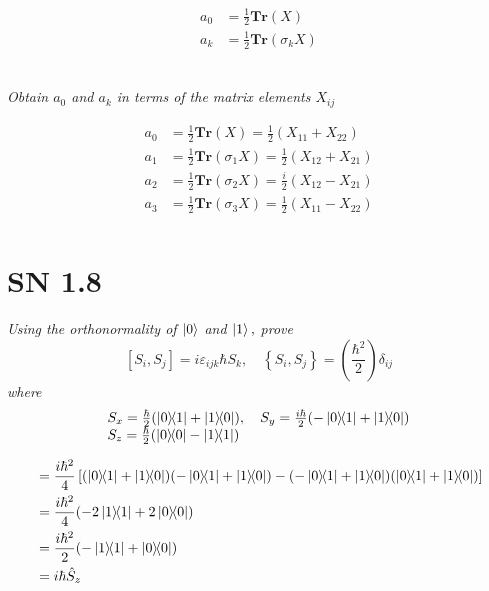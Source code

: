 \documentclass{article}
\begin{document}
\begin{equation*}
    \boxed{\begin{align*}
            a_{0}&=\frac{1}{2}\mathbf{Tr}(X)\\
            a_{k}&=\frac{1}{2} \mathbf{Tr}\left(\sigma_{k} X\right)\\
        \end{align*}}
\end{equation*}


\subsection{}
\textit{Obtain $a_{0}$ and $a_{k}$ in terms of the matrix elements $X_{i j}$}


\begin{align*}
    a_{0}&=\frac{1}{2}\mathbf{Tr}(X) = \frac{1}{2}(X_{11} + X_{22})\\
    a_{1}&=\frac{1}{2} \mathbf{Tr}\left(\sigma_{1} X\right) = \frac{1}{2}(X_{12} + X_{21})\\
    a_{2}&=\frac{1}{2} \mathbf{Tr}\left(\sigma_{2} X\right) = \frac{i}{2}(X_{12} - X_{21})\\
    a_{3}&=\frac{1}{2} \mathbf{Tr}\left(\sigma_{3} X\right) = \frac{1}{2}(X_{11} - X_{22})\\
\end{align*}

\newpage

\section{SN 1.8}
\textit{Using the orthonormality of $\ket{0}$ and $\ket{1},$ prove
$$
\left[S_{i}, S_{j}\right]=i \varepsilon_{i j k} \hbar S_{k}, \quad\left\{S_{i}, S_{j}\right\}=\left(\frac{\hbar^{2}}{2}\right) \delta_{i j}
$$
where
$$
\begin{array}{l}
S_{x}=\frac{\hbar}{2}(\ketbra{0}{1}+\ketbra{1}{0}), \quad S_{y}=\frac{i \hbar}{2}(-\ketbra{0}{1}+\ketbra{1}{0}) \\
S_{z}=\frac{\hbar}{2}(\ketbra{0}{0}-\ketbra{1}{1})
\end{array}
$$}

\begin{align*}
    [\hat{S}_x, \hat{S}_y] &= \frac{i \hbar^2 }{4}\left[(\ketbra{0}{1}+\ketbra{1}{0})(-\ketbra{0}{1}+\ketbra{1}{0}) - (-\ketbra{0}{1}+\ketbra{1}{0})(\ketbra{0}{1}+\ketbra{1}{0})\right]\\
    &= \frac{i \hbar^2 }{4} (-2\ketbra{1}{1} +  2 \ketbra{0}{0} )\\
    &= \frac{i \hbar^2 }{2} (-\ketbra{1}{1} +   \ketbra{0}{0} )\\
    &= i \hbar \hat{S}_z 
\end{align*}
\end{document}
